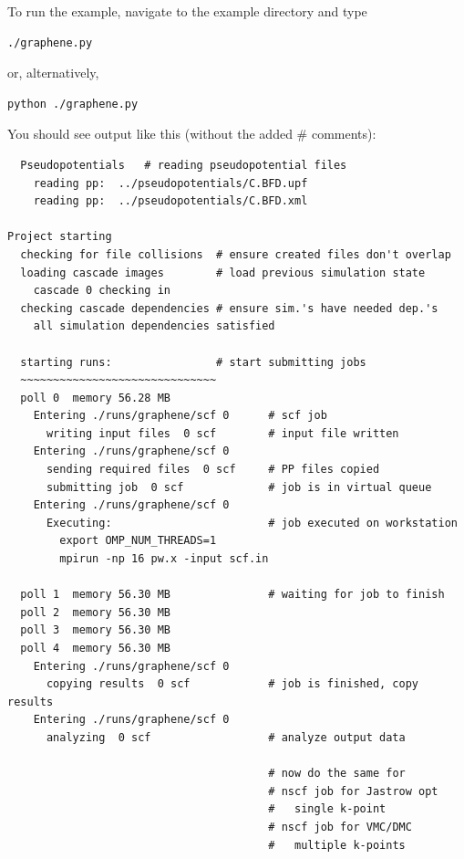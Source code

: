\documentclass[oneside,11pt]{memoir}
\numberwithin{equation}{section}
\begin{document}
To run the example, navigate to the example directory and type
\begin{shaded}
\begin{verbatim}
./graphene.py
\end{verbatim}
\end{shaded}
or, alternatively, 
\begin{shaded}
\begin{verbatim}
python ./graphene.py
\end{verbatim}
\end{shaded}

You should see output like this (without the added \# comments):
\begin{shaded}
\begin{verbatim}
  Pseudopotentials   # reading pseudopotential files
    reading pp:  ../pseudopotentials/C.BFD.upf
    reading pp:  ../pseudopotentials/C.BFD.xml

Project starting 
  checking for file collisions  # ensure created files don't overlap
  loading cascade images        # load previous simulation state
    cascade 0 checking in 
  checking cascade dependencies # ensure sim.'s have needed dep.'s
    all simulation dependencies satisfied 
  
  starting runs:                # start submitting jobs
  ~~~~~~~~~~~~~~~~~~~~~~~~~~~~~~ 
  poll 0  memory 56.28 MB 
    Entering ./runs/graphene/scf 0      # scf job
      writing input files  0 scf        # input file written 
    Entering ./runs/graphene/scf 0 
      sending required files  0 scf     # PP files copied
      submitting job  0 scf             # job is in virtual queue
    Entering ./runs/graphene/scf 0 
      Executing:                        # job executed on workstation
        export OMP_NUM_THREADS=1
        mpirun -np 16 pw.x -input scf.in 

  poll 1  memory 56.30 MB               # waiting for job to finish
  poll 2  memory 56.30 MB 
  poll 3  memory 56.30 MB 
  poll 4  memory 56.30 MB 
    Entering ./runs/graphene/scf 0 
      copying results  0 scf            # job is finished, copy results
    Entering ./runs/graphene/scf 0 
      analyzing  0 scf                  # analyze output data

                                        # now do the same for
                                        # nscf job for Jastrow opt
                                        #   single k-point
                                        # nscf job for VMC/DMC
                                        #   multiple k-points


\end{verbatim}
\end{shaded}
\end{document}
